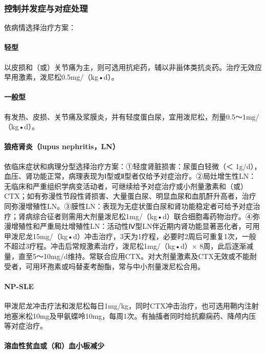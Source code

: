 \subsubsection{控制并发症与对症处理}

依病情选择治疗方案：

\paragraph{轻型}

以皮损和（或）关节痛为主，则可选用抗疟药，辅以非甾体类抗炎药。治疗无效应早用激素，泼尼松0.5mg/（kg•d）。

\paragraph{一般型}

有发热、皮损、关节痛及浆膜炎，并有轻度蛋白尿，宜用泼尼松，剂量0.5～1mg/（kg•d）。

\paragraph{狼疮肾炎（lupus nephritis，LN）}

依临床症状和病理分型选择治疗方案：①轻度肾脏损害：尿蛋白轻微（＜
1g/d），血压、肾功能正常，病理表现为Ⅰ型或Ⅱ型者仅给予对症治疗。②局灶增生性LN：无临床和严重组织学病变活动者，可继续给予对症治疗或小剂量激素和（或）CTX；如有弥漫性节段性肾损害、大量蛋白尿、明显血尿和血肌酐升高者，治疗同弥漫增殖性LN。③膜性LN：表现为无症状蛋白尿和肾功能稳定者可给予对症治疗；肾病综合征者则需用大剂量泼尼松1mg/（kg•d）联合细胞毒药物治疗。④弥漫增殖性和严重局灶增殖性LN：活动性Ⅳ型LN伴近期内肾功能显著恶化者，可用甲泼尼龙15mg/（kg•d）冲击治疗，3天为1疗程，必要时2周后可重复1次，一般不超过3疗程。冲击后常规激素治疗，泼尼松1mg/（kg•d）×
8周，此后逐渐减量，直至5～10mg/d维持。常联合应用CTX。对大剂量激素及CTX无效或不能耐受者，可用环孢素或吗替麦考酚酯，常与中小剂量泼尼松合用。

\paragraph{NP-SLE}

甲泼尼龙冲击疗法和泼尼松每日1mg/kg，同时CTX冲击治疗，也可选用鞘内注射地塞米松10mg及甲氨蝶呤10mg，每周1次。有抽搐者同时给抗癫痫药、降颅内压等对症治疗。

\paragraph{溶血性贫血或（和）血小板减少}

